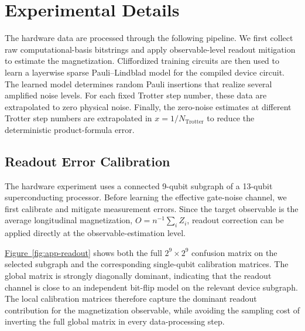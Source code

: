 \documentclass[aps,pra,reprint,groupedaddress,floatfix]{revtex4-2}
\newcommand{\fig}[1]{\hyperref[fig:#1]{Figure~\ref*{fig:#1}}}
\begin{document}
\section{Experimental Details}\label{append:exp}

The hardware data are processed through the following pipeline. We first collect raw computational-basis bitstrings and apply observable-level readout mitigation to estimate the magnetization. Cliffordized training circuits are then used to learn a layerwise sparse Pauli--Lindblad model for the compiled device circuit. The learned model determines random Pauli insertions that realize several amplified noise levels. For each fixed Trotter step number, these data are extrapolated to zero physical noise. Finally, the zero-noise estimates at different Trotter step numbers are extrapolated in $x=1/N_{\mathrm{Trotter}}$ to reduce the deterministic product-formula error.

\subsection{Readout Error Calibration}
\label{append:readout}

The hardware experiment uses a connected 9-qubit subgraph of a 13-qubit superconducting processor. Before learning the effective gate-noise channel, we first calibrate and mitigate measurement errors. Since the target observable is the average longitudinal magnetization, $O=n^{-1}\sum_i Z_i$, readout correction can be applied directly at the observable-estimation level.

\fig{app-readout} shows both the full $2^9\times 2^9$ confusion matrix on the selected subgraph and the corresponding single-qubit calibration matrices. The global matrix is strongly diagonally dominant, indicating that the readout channel is close to an independent bit-flip model on the relevant device subgraph. The local calibration matrices therefore capture the dominant readout contribution for the magnetization observable, while avoiding the sampling cost of inverting the full global matrix in every data-processing step.
\end{document}
